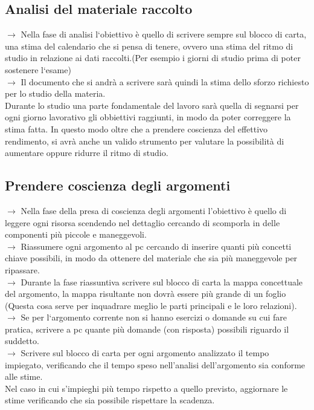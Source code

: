 \documentclass[11pt,a4paper]{article}
\begin{document}
\subsection{Analisi del materiale raccolto}
$\rightarrow$ Nella fase di analisi l`obiettivo è quello di scrivere sempre sul blocco di carta, una stima del calendario che si pensa di tenere, ovvero una stima del ritmo di studio in relazione ai dati raccolti.(Per esempio i giorni di studio prima di poter sostenere l`esame)\\
$\rightarrow$ Il documento che si andrà a scrivere sarà quindi la stima dello sforzo richiesto per lo studio della materia.\\
 Durante lo studio una parte fondamentale del lavoro sarà quella di segnarsi per ogni giorno lavorativo gli obbiettivi raggiunti, in modo da poter correggere la stima fatta. In questo modo oltre che a prendere coscienza del effettivo rendimento, si avrà anche un valido strumento per valutare la possibilità di aumentare oppure ridurre il ritmo di studio.\\

\subsection{Prendere coscienza degli argomenti}
$\rightarrow$ Nella fase della presa di coscienza degli argomenti l'obiettivo è quello di leggere ogni risorsa scendendo nel dettaglio cercando di scomporla in delle componenti più piccole e maneggevoli.\\
$\rightarrow$ Riassumere ogni argomento al pc cercando di inserire quanti più concetti chiave possibili, in modo da ottenere del materiale che sia più maneggevole per ripassare.\\
$\rightarrow$ Durante la fase riassuntiva scrivere sul blocco di carta la mappa concettuale del argomento, la mappa risultante non dovrà essere più grande di un foglio (Questa cosa serve per inquadrare meglio le parti principali e le loro relazioni).\\
$\rightarrow$ Se per l`argomento corrente non si hanno esercizi o domande su cui fare pratica, scrivere a pc quante più domande (con risposta) possibili riguardo il suddetto.\\
$\rightarrow$ Scrivere sul blocco di carta per ogni argomento analizzato il tempo impiegato, verificando che il tempo speso nell'analisi dell'argomento sia conforme alle stime.\\
 Nel caso in cui s'impieghi più tempo rispetto a quello previsto, aggiornare le stime verificando che sia possibile rispettare la scadenza.\\
\end{document}
